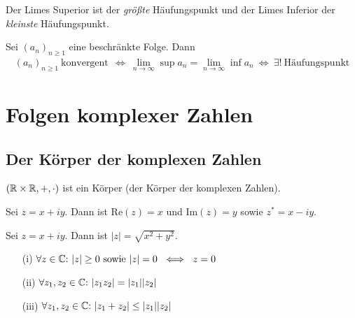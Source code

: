 \begin{framedthm}
	Der Limes Superior ist der \textit{größte} Häufungspunkt und der Limes Inferior der \textit{kleinste} Häufungspunkt.
\end{framedthm}


\begin{framedthm}
	Sei $(a_n)_{n\geq 1}$ eine beschränkte Folge. Dann
	\begin{align*}
		(a_n)_{n\geq 1} \ \textrm{konvergent}\ \ \iff\  \lim_{n \to \infty} \sup a_n =\lim_{n \to \infty} \inf a_n \ \iff \ \exists! \ \textrm{Häufungspunkt}
	\end{align*}
\end{framedthm}

\section{Folgen komplexer Zahlen}

\subsection{Der Körper der komplexen Zahlen}

\begin{framedthm}
	$(\mathbb{R} \times \mathbb{R}, +, \cdot)$ ist ein Körper (der Körper der komplexen Zahlen).
\end{framedthm}

\begin{frameddefn}
	Sei $z = x + iy$. Dann ist $\textrm{Re}(z) = x$ und $\textrm{Im}(z) = y$ sowie $z^* = x - iy$.
\end{frameddefn}

\begin{frameddefn}
	Sei $z = x + iy$. Dann ist $|z| = \sqrt{x^2+y^2}$.
\end{frameddefn}

\begin{framedthm}
	\begin{enumerate}
		\item[(i)] $\forall z \in \mathbb{C}{:}\  |z| \geq 0 \textrm{ sowie } |z| = 0 \ \iff\ z = 0$
		\item[(ii)] $\forall z_1,z_2 \in \mathbb{C}{:}\  |z_1 z_2| = |z_1| |z_2|$
		\item[(iii)] $\forall z_1,z_2 \in \mathbb{C}{:}\  |z_1 + z_2| \leq |z_1| |z_2|$
	\end{enumerate}
\end{framedthm}

